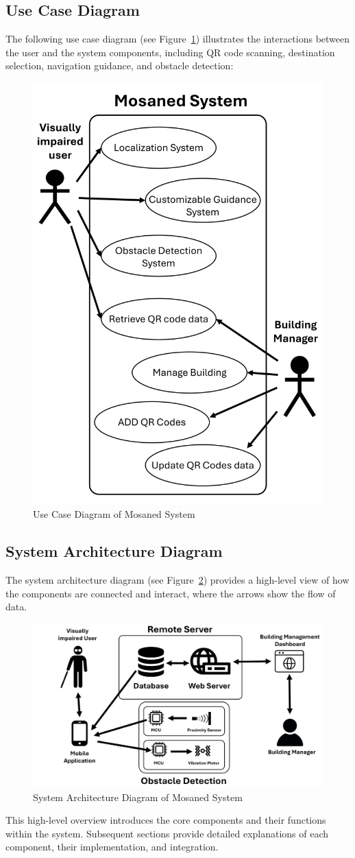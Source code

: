 \subsection{Use Case Diagram}

The following use case diagram (see Figure~\ref{fig:use_case_diagram}) illustrates the interactions between the user and the system components, including QR code scanning, destination selection, navigation guidance, and obstacle detection:

\begin{figure}[h]
	\centering
	\includegraphics[width=0.6\linewidth]{assets/ch2/use_case}
	\caption{Use Case Diagram of Mosaned System}
	\label{fig:use_case_diagram}
\end{figure}

\subsection{System Architecture Diagram}

The system architecture diagram (see Figure~\ref{fig:system_architecture}) provides a high-level view of how the components are connected and interact, where the arrows show the flow of data. 

\begin{figure}[h]
	\centering
	\includegraphics[width=1\linewidth]{assets/ch2/sys_arch}
	\caption{System Architecture Diagram of Mosaned System}
	\label{fig:system_architecture}
\end{figure}

This high-level overview introduces the core components and their functions within the system. Subsequent sections provide detailed explanations of each component, their implementation, and integration.
